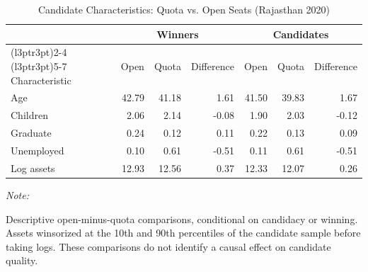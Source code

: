 \begin{table}
\centering
\caption{\label{tab:main_cand_char}Candidate Characteristics: Quota vs. Open Seats (Rajasthan 2020)}
\centering
\fontsize{8}{10}\selectfont
\begin{threeparttable}
\begin{tabular}[t]{lrrrrrr}
\toprule
\multicolumn{1}{c}{ } & \multicolumn{3}{c}{Winners} & \multicolumn{3}{c}{Candidates} \\
\cmidrule(l{3pt}r{3pt}){2-4} \cmidrule(l{3pt}r{3pt}){5-7}
Characteristic & Open & Quota & Difference & Open & Quota & Difference\\
\midrule
Age & 42.79 & 41.18 & 1.61 & 41.50 & 39.83 & 1.67\\
Children & 2.06 & 2.14 & -0.08 & 1.90 & 2.03 & -0.12\\
Graduate & 0.24 & 0.12 & 0.11 & 0.22 & 0.13 & 0.09\\
Unemployed & 0.10 & 0.61 & -0.51 & 0.11 & 0.61 & -0.51\\
Log assets & 12.93 & 12.56 & 0.37 & 12.33 & 12.07 & 0.26\\
\bottomrule
\end{tabular}
\begin{tablenotes}
\item \textit{Note: } 
\item Descriptive open-minus-quota comparisons, conditional on candidacy or winning. Assets winsorized at the 10th and 90th percentiles of the candidate sample before taking logs. These comparisons do not identify a causal effect on candidate quality.
\end{tablenotes}
\end{threeparttable}
\end{table}
